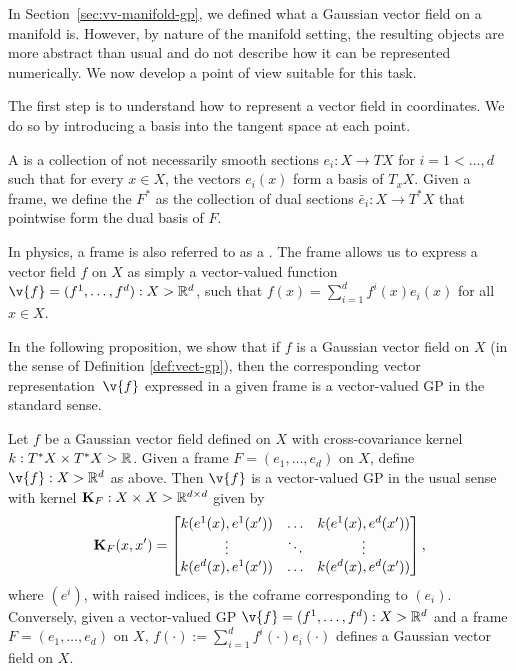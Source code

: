 In Section~\ref{sec:vv-manifold-gp}, we defined what a Gaussian vector field on a manifold is.
However, by nature of the manifold setting, the resulting objects are more abstract than usual and do not describe how it can be represented numerically.
We now develop a point of view suitable for this task.

The first step is to understand how to represent a vector field in coordinates.
We do so by introducing a basis into the tangent space at each point.
\begin{definition}
	A  is a collection of not necessarily smooth sections $e_i: X \to TX$ for $i=1<.
		.., d$ such that for every $x \in X$, the vectors $e_i(x)$ form a basis of $T_xX$.
	Given a frame, we define the  $F^*$ as the collection of dual sections $\bar{e}_i: X \to T^*X$ that pointwise form the dual basis of $F$.
\end{definition}

In physics, a frame is also referred to as a .
The frame allows us to express a vector field $f$ on $X$ as simply a vector-valued function $\v{f} = (f^1, \ldots, f^d) : X \-> \R^d$, such that $f(x) = \sum_{i=1}^d f^i(x) e_i(x)$ for all $x \in X$.

In the following proposition, we show that if $f$ is a Gaussian vector field on $X$ (in the sense of Definition \ref{def:vect-gp}), then the corresponding vector representation~$\v{f}$ expressed in a given frame is a vector-valued GP in the standard sense.
\begin{proposition}
	\label{prop:matrix-representation}
	Let $f$ be a Gaussian vector field defined on $X$ with cross-covariance kernel ${k : T^*X \times T^*X \-> \mathbb{R}}$.
	Given a frame $F = (e_1, \ldots, e_d)$ on $X$, define $\v{f} : X \-> \R^d$ as above.
	Then $\v{f}$ is a vector-valued GP in the usual sense with kernel ${\m{K}_F : X \x X \-> \R^{d \x d}}$ given by \[ \m{K}_F(x, x') = \begin{bmatrix} \label{eq:K_F} k(e^1(x), e^1(x')) & \dots & k(e^1(x), e^d(x')) \\ \vdots & \ddots & \vdots \\ k(e^d(x), e^1(x')) & \dots & k(e^d(x), e^d(x')) \end{bmatrix}, \] where $(e^i)$, with raised indices, is the coframe corresponding to $(e_i)$.
	Conversely, given a vector-valued GP $\v{f} = (f^1, \ldots, f^d): X \-> \R^d$ and a frame $F = (e_1, \ldots, e_d)$ on $X$, $f(\cdot) := \sum_{i=1}^d f^i(\cdot) e_i(\cdot)$ defines a Gaussian vector field on $X$.
\end{proposition}

